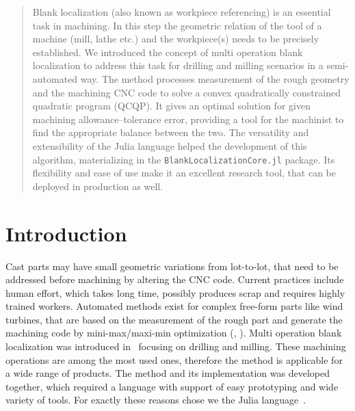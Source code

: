 \documentclass{juliacon}
\begin{document}


\maketitle

\begin{abstract}

Blank localization (also known as workpiece referencing) is an essential task in machining.
In this step the geometric relation of the tool of a machine (mill, lathe etc.) and the workpiece(s) needs to be precisely established.
We introduced the concept of multi operation blank localization to address this task for drilling and milling scenarios in a semi-automated way.
The method processes measurement of the rough geometry and the machining CNC code to solve a convex quadratically constrained quadratic program (QCQP).
It gives an optimal solution for given machining allowance--tolerance error, providing a tool for the machinist to find the appropriate balance between the two.
The versatility and extensibility of the Julia language helped the development of this algorithm, materializing in the \texttt{BlankLocalizationCore.jl} package.
Its flexibility and ease of use make it an excellent research tool, that can be deployed in production as well.
\end{abstract}

\section{Introduction}
\label{sec:intro}
Cast parts may have small geometric variations from lot-to-lot, that need to be addressed before machining by altering the CNC code.
Current practices include human effort, which takes long time, possibly produces scrap and requires highly trained workers.
Automated methods exist for complex free-form parts like wind turbines, that are based on the measurement of the rough part and generate the machining code by mini-max/maxi-min optimization (\cite{tan:2014_UnconstrainedApproachBlank}, \cite{ding:2021_CoarsefineOptimizationMethod}).
Multi operation blank localization was introduced in~\cite{cserteg:2023_Annals} focusing on drilling and milling.
These machining operations are among the most used ones, therefore the method is applicable for a wide range of products.
The method and its implementation was developed together, which required a language with support of easy prototyping and wide variety of tools.
For exactly these reasons chose we the Julia language~\cite{bezanson2017julia}.
\end{document}
